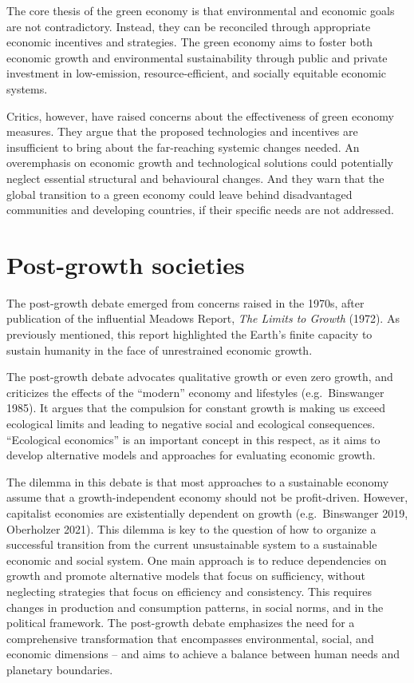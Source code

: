 \documentclass[
  a4paper,
  openany]{book}
\begin{document}
The core thesis of the green economy is that environmental and economic
goals are not contradictory. Instead, they can be reconciled through
appropriate economic incentives and strategies. The green economy aims
to foster both economic growth and environmental sustainability through
public and private investment in low-emission, resource-efficient, and
socially equitable economic systems.

Critics, however, have raised concerns about the effectiveness of green
economy measures. They argue that the proposed technologies and
incentives are insufficient to bring about the far-reaching systemic
changes needed. An overemphasis on economic growth and technological
solutions could potentially neglect essential structural and behavioural
changes. And they warn that the global transition to a green economy
could leave behind disadvantaged communities and developing countries,
if their specific needs are not addressed.

\section{Post-growth societies}\label{post-growth-societies}

The post-growth debate emerged from concerns raised in the 1970s, after
publication of the influential Meadows Report, \emph{The Limits to
Growth} (1972). As previously mentioned, this report highlighted the
Earth's finite capacity to sustain humanity in the face of unrestrained
economic growth.

The post-growth debate advocates qualitative growth or even zero growth,
and criticizes the effects of the ``modern'' economy and lifestyles
(e.g.~Binswanger 1985). It argues that the compulsion for constant
growth is making us exceed ecological limits and leading to negative
social and ecological consequences. ``Ecological economics'' is an
important concept in this respect, as it aims to develop alternative
models and approaches for evaluating economic growth.

The dilemma in this debate is that most approaches to a sustainable
economy assume that a growth-independent economy should not be
profit-driven. However, capitalist economies are existentially dependent
on growth (e.g.~Binswanger 2019, Oberholzer 2021). This dilemma is key
to the question of how to organize a successful transition from the
current unsustainable system to a sustainable economic and social
system. One main approach is to reduce dependencies on growth and
promote alternative models that focus on sufficiency, without neglecting
strategies that focus on efficiency and consistency. This requires
changes in production and consumption patterns, in social norms, and in
the political framework. The post-growth debate emphasizes the need for
a comprehensive transformation that encompasses environmental, social,
and economic dimensions -- and aims to achieve a balance between human
needs and planetary boundaries.
\end{document}
